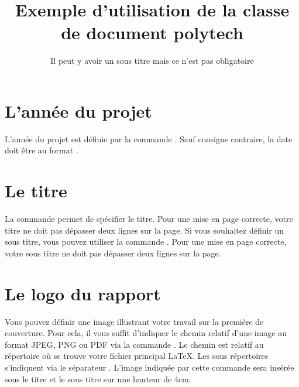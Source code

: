 \documentclass[overfullbox,hideweeklyreports,noseparatecontributorspage,nodate]{polytech/polytech}
\begin{document}
\section{L'année du projet}

L'année du projet est définie par la commande . Sauf consigne contraire, la date doit être au format .
\begin{latexsource}
\end{latexsource}

\section{Le titre}

La commande  permet de spécifier le titre. Pour une mise en page correcte, votre titre ne doit pas dépasser deux lignes sur la page. Si vous souhaitez définir un sous titre, vous pouvez utiliser la commande . Pour une mise en page correcte, votre sous titre ne doit pas dépasser deux lignes sur la page.

\begin{latexsource}
\title{Exemple d'utilisation de la classe de document polytech}
\subtitle{Il peut y avoir un sous titre mais ce n'est pas obligatoire}
\end{latexsource}

\section{Le logo du rapport}

Vous pouvez définir une image illustrant votre travail sur la première de couverture. Pour cela, il vous suffit d'indiquer le chemin relatif d'une image au format JPEG, PNG ou PDF via la commande . Le chemin est relatif au répertoire où se trouve votre fichier principal \LaTeX. Les sous répertoires s'indiquent via le séparateur \latexcode{/}. L'image indiquée par cette commande sera insérée sous le titre et le sous titre sur une hauteur de 4cm.

\begin{latexsource}
\end{latexsource}
\end{document}
